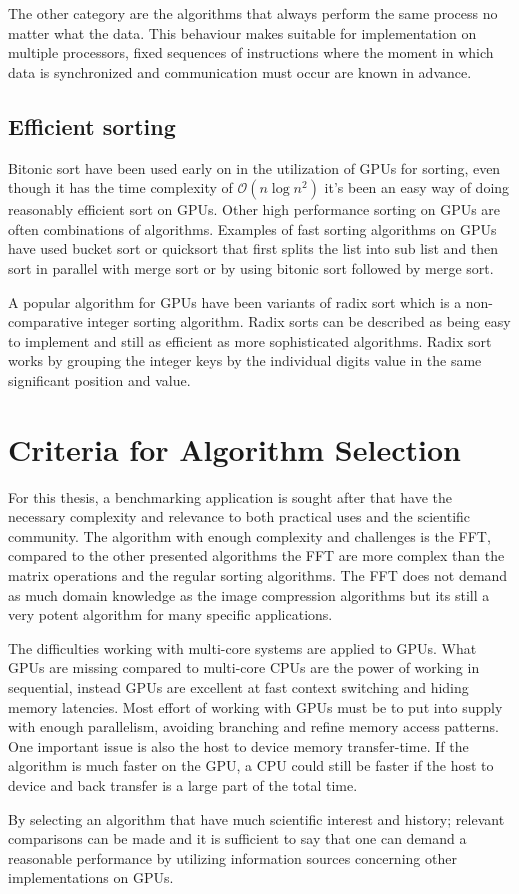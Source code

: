 The other category are the algorithms that always perform the same process no matter what the data. This behaviour makes suitable for implementation on multiple processors, fixed sequences of instructions where the moment in which data is synchronized and communication must occur are known in advance.

\subsection{Efficient sorting}
Bitonic sort have been used early on in the utilization of \gls{GPU}s for sorting, even though it has the time complexity of $\mathcal{O}(n\log{n^2})$ it's been an easy way of doing reasonably efficient sort on \gls{GPU}s. Other high performance sorting on \gls{GPU}s are often combinations of algorithms. Examples of fast sorting algorithms on GPUs have used bucket sort or quicksort that first splits the list into sub list and then sort in parallel with merge sort or by using bitonic sort followed by merge sort.

A popular algorithm for GPUs have been variants of radix sort which is a non-comparative integer sorting algorithm. Radix sorts can be described as being easy to implement and still as efficient as more sophisticated algorithms. Radix sort works by grouping the integer keys by the individual digits value in the same significant position and value.

\section{Criteria for Algorithm Selection}
For this thesis, a benchmarking application is sought after that have the necessary complexity and relevance to both practical uses and the scientific community. The algorithm with enough complexity and challenges is the \gls{FFT}, compared to the other presented algorithms the \gls{FFT} are more complex than the matrix operations and the regular sorting algorithms. The \gls{FFT} does not demand as much domain knowledge as the image compression algorithms but its still a very potent algorithm for many specific applications.

The difficulties working with multi-core systems are applied to \gls{GPU}s. What \gls{GPU}s are missing compared to multi-core \gls{CPU}s are the power of working in sequential, instead \gls{GPU}s are excellent at fast context switching and hiding memory latencies. Most effort of working with \gls{GPU}s must be to put into supply with enough parallelism, avoiding branching and refine memory access patterns. One important issue is also the host to device memory transfer-time. If the algorithm is much faster on the \gls{GPU}, a \gls{CPU} could still be faster if the host to device and back transfer is a large part of the total time.

By selecting an algorithm that have much scientific interest and history; relevant comparisons can be made and it is sufficient to say that one can demand a reasonable performance by utilizing information sources concerning other implementations on \gls{GPU}s.